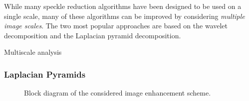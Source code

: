 While many speckle reduction algorithms have been designed to be used on a single scale, many of these algorithms can be improved by considering \textit{multiple image scales}.
The two most popular approaches are based on the wavelet decomposition and the Laplacian pyramid decomposition.

Multiscale analysis 

\subsubsection{Laplacian Pyramids}
\begin{figure}
  \centering
  \hspace{0.2in}
  \caption{Block diagram of the considered image enhancement scheme.}
\end{figure}



